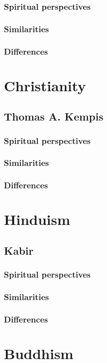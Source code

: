 \documentclass[11pt,a4paper]{scrartcl} %
\begin{document}
     \subsubsection{Spiritual perspectives}
     \subsubsection{Similarities}
     \subsubsection{Differences}
    \section{Christianity}
    \subsection{Thomas A. Kempis}
\subsubsection{Spiritual perspectives}
     \subsubsection{Similarities}
     \subsubsection{Differences}
    \section{Hinduism}
    \subsection{Kabir}
    \subsubsection{Spiritual perspectives}
     \subsubsection{Similarities}
     \subsubsection{Differences}
    \section{Buddhism}
\end{document}
